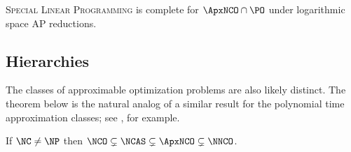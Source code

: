 \documentclass[]{article}
\begin{document}
\begin{conjecture}
  \textsc{Special Linear Programming} is complete for $\ApxNCO \cap \PO$ under logarithmic space AP reductions.
\end{conjecture}

\subsection{Hierarchies}

The classes of approximable optimization problems are also likely distinct.
The theorem below is the natural analog of a similar result for the polynomial time approximation classes; see \cite[Exercise~8.1]{acgkmp99}, for example.

\begin{theorem}\label{thm:hierarchy}
  If $\NC \neq \NP$ then $\NCO \subsetneq \NCAS \subsetneq \ApxNCO \subsetneq \NNCO$.
\end{theorem}
\end{document}
